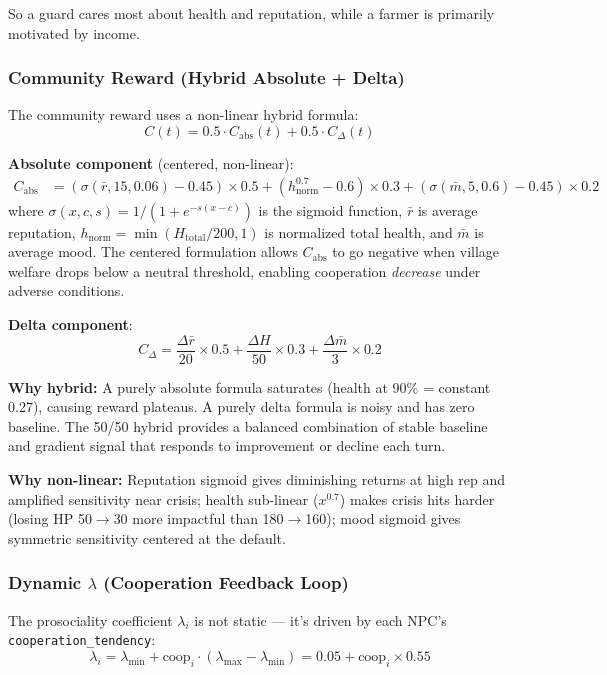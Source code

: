 So a guard cares most about health and reputation, while a farmer is primarily motivated by income.

\subsubsection{Community Reward (Hybrid Absolute + Delta)}

The community reward uses a non-linear hybrid formula:
$$C(t) = 0.5 \cdot C_{\text{abs}}(t) + 0.5 \cdot C_{\Delta}(t)$$

\textbf{Absolute component} (centered, non-linear):
\begin{align}
    C_{\text{abs}} &= (\sigma(\bar{r}, 15, 0.06) - 0.45) \times 0.5 + (h_{\text{norm}}^{0.7} - 0.6) \times 0.3 + (\sigma(\bar{m}, 5, 0.6) - 0.45) \times 0.2
\end{align}
where $\sigma(x, c, s) = 1/(1 + e^{-s(x - c)})$ is the sigmoid function, $\bar{r}$ is average reputation, $h_{\text{norm}} = \min(H_{\text{total}}/200, 1)$ is normalized total health, and $\bar{m}$ is average mood. The centered formulation allows $C_{\text{abs}}$ to go negative when village welfare drops below a neutral threshold, enabling cooperation \emph{decrease} under adverse conditions.

\textbf{Delta component}:
$$C_{\Delta} = \frac{\Delta \bar{r}}{20} \times 0.5 + \frac{\Delta H}{50} \times 0.3 + \frac{\Delta \bar{m}}{3} \times 0.2$$

\textbf{Why hybrid:} A purely absolute formula saturates (health at 90\% = constant 0.27), causing reward plateaus. A purely delta formula is noisy and has zero baseline. The 50/50 hybrid provides a balanced combination of stable baseline and gradient signal that responds to improvement or decline each turn.

\textbf{Why non-linear:} Reputation sigmoid gives diminishing returns at high rep and amplified sensitivity near crisis; health sub-linear ($x^{0.7}$) makes crisis hits harder (losing HP 50$\to$30 more impactful than 180$\to$160); mood sigmoid gives symmetric sensitivity centered at the default.

\subsubsection{Dynamic \texorpdfstring{$\lambda$}{Lambda} (Cooperation Feedback Loop)}

The prosociality coefficient $\lambda_i$ is not static --- it's driven by each NPC's \texttt{cooperation\_tendency}:
$$\lambda_i = \lambda_{\min} + \text{coop}_i \cdot (\lambda_{\max} - \lambda_{\min}) = 0.05 + \text{coop}_i \times 0.55$$

